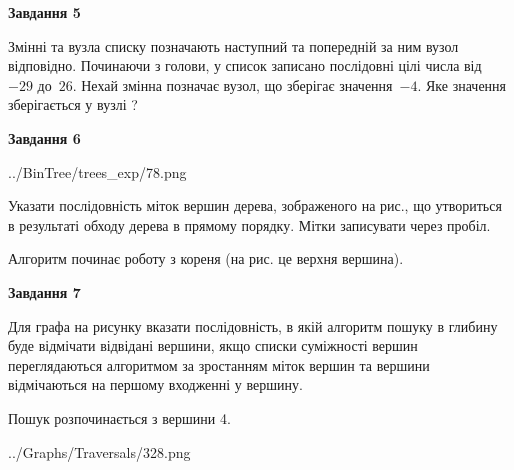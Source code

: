 \documentclass[12pt, ukrainian]{article}
\begin{document}
{\begin {large}
{\begin {center}\textbf{Завдання 5}\end {center}}\par
Змінні  та  вузла списку позначають наступний та попередній за ним вузол відповідно. Починаючи з голови, у список записано послідовні цілі числа від~$-29$ до~$26$. Нехай змінна  позначає вузол, що зберігає значення~$-4$.
Яке значення зберігається у вузлі  ?\par
\newpage

{\begin {center}\textbf{Завдання 6}\end {center}}\par

\begin{center}
	{../BinTree/trees_exp/78.png}
\end{center}
Указати послідовність міток вершин дерева, зображеного на рис., що утвориться в результаті обходу дерева в прямому порядку. Мітки записувати через пробіл.\par Алгоритм починає роботу з кореня (на рис. це верхня вершина).\par
\newpage

{\begin {center}\textbf{Завдання 7}\end {center}}\par
Для графа на рисунку вказати послідовність, в якій алгоритм пошуку в глибину буде відмічати відвідані вершини, якщо списки суміжності вершин переглядаються алгоритмом за зростанням міток вершин та вершини відмічаються на першому вход\-женні у вершину.\par
Пошук розпочинається з вершини 4.\par

\begin{center}
	{../Graphs/Traversals/328.png}
\end{center}\par
\newpage


\end{large}}
\end{document}
